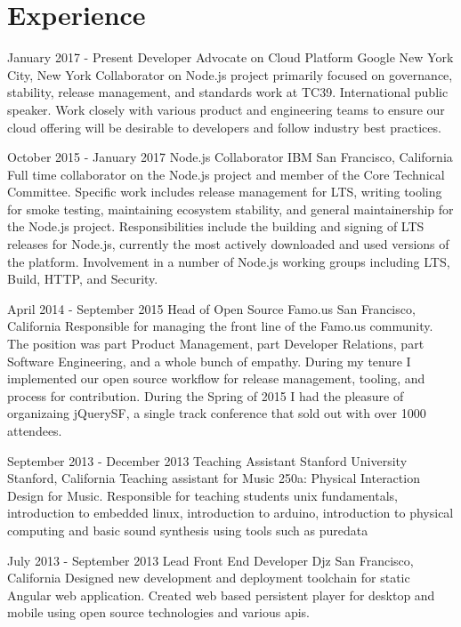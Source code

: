 \documentclass[10pt,a4paper,sans]{moderncv}   %
\begin{document}
\makecvtitle

\section{Experience}

\cventry
  {January 2017 - Present}
  {Developer Advocate on Cloud Platform}
  {Google}
  {New York City, New York}{}
  {Collaborator on Node.js project primarily focused on governance, stability, release management, and standards work at TC39. International public speaker. Work closely with various product and engineering teams to ensure our cloud offering will be desirable to developers and follow industry best practices. }

\cventry
  {October 2015 - January 2017}
  {Node.js Collaborator}
  {IBM}
  {San Francisco, California}{}
  {Full time collaborator on the Node.js project and member of the Core Technical Committee. Specific work includes release management for LTS, writing tooling for smoke testing, maintaining ecosystem stability, and general maintainership for the Node.js project.  Responsibilities include the building and signing of LTS releases for Node.js, currently the most actively downloaded and used versions of the platform. Involvement in a number of Node.js working groups including LTS, Build, HTTP, and Security.  }

\cventry
  {April 2014 - September 2015}
  {Head of Open Source}
  {Famo.us}
  {San Francisco, California}{}
  {Responsible for managing the front line of the Famo.us community. The position was part Product Management, part Developer Relations, part Software Engineering, and a whole bunch of empathy.  During my tenure I implemented our open source workflow for release management, tooling, and process for contribution. During the Spring of 2015 I had the pleasure of organizaing jQuerySF, a single track conference that sold out with over 1000 attendees.}

\cventry
  {September 2013 - December 2013}
  {Teaching Assistant}
  {Stanford University}
  {Stanford, California}{}
  {Teaching assistant for Music 250a: Physical Interaction Design for Music.  Responsible for teaching students unix fundamentals, introduction to embedded linux, introduction to arduino, introduction to physical computing and basic sound synthesis using tools such as puredata}

\cventry
  {July 2013 - September 2013}
  {Lead Front End Developer}
  {Djz}
  {San Francisco, California}{}
  {Designed new development and deployment toolchain for static Angular web application.  Created web based persistent player for desktop and mobile using open source technologies and various apis.}
\end{document}
